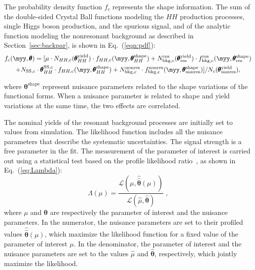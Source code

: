 \documentclass[PAPER, cernpreprint, texlive=2016, paper=a4, USenglish, texmf]{atlasdoc}
\begin{document}
The probability density function $f_c$ represents the shape information. The sum of the double-sided Crystal Ball functions modeling the $HH$ production processes, single Higgs boson production, and the spurious signal, and of the analytic function modeling the nonresonant background as described in  Section~\ref{sec:backpar}, is shown in Eq.~(\ref{eqn:pdf}):
\begin{multline}
\label{eqn:pdf}
f_{c}(\myy, \pmb{\theta}) = [\mu \cdot N_{HH,\mathrm{c}}( \pmb{\theta}_{HH}^\mathrm{yield}) \cdot f_{HH,\mathrm{c}}(\myy,  \pmb{\theta}_{HH}^\mathrm{shape}) + N^{\mathrm{res}}_{\mathrm{bkg, c}}( \pmb{\theta}_{\mathrm{res}}^\mathrm{yield}) \cdot f^{\mathrm{res}}_\mathrm{bkg, c}(\myy,  \pmb{\theta}_{\mathrm{res}}^\mathrm{shape}) \\ + N_\mathrm{SS,c} \cdot  \pmb{\theta}_{HH}^\mathrm{SS, c} \cdot f_{HH,\mathrm{c}}(\myy,  \pmb{\theta}_{HH}^\mathrm{shape}) + N^{\mathrm{nonres}}_{\mathrm{bkg,c}} \cdot f^{\mathrm{nonres}}_{\mathrm{bkg,c}}(\myy,  \pmb{\theta}_{\mathrm{nonres}}^\mathrm{shape})]/N_c( \pmb{\theta}_{\mathrm{nonres}}^\mathrm{yield}),
\end{multline}
 
where $ \pmb{\theta}^\mathrm{shape}$ represent nuisance parameters related to the shape variations of the functional forms. When a nuisance parameter is related to shape and yield variations at the same time, the two effects are correlated.
 
The nominal yields of the resonant background processes are initially set to values from simulation.
The likelihood function includes all the nuisance parameters that describe the systematic uncertainties. The signal strength is a free parameter in the fit.
The measurement of the parameter of interest is carried out using a statistical test based on the profile likelihood ratio~\cite{Cowan:2010js}, as shown in Eq.~(\ref{eq:Lambda}):
\begin{equation}
\Lambda(\mu) =
\frac{\mathcal{L}(\mu, \hat{\hat{\pmb{\theta}}}(\mu)) }{\mathcal{L}(\hat{\mu}, \hat{\pmb{\theta}})} \;,
\label{eq:Lambda}
\end{equation}
where $\mu$ and $\pmb{\theta}$ are respectively the parameter of interest and the nuisance parameters.
In the numerator, the nuisance parameters are set to their profiled values $\hat{\hat{\pmb{\theta}}}(\mu)$, which maximize the likelihood function for a fixed value of the parameter of interest $\mu$. In the denominator, the parameter of interest and the nuisance parameters are set to the values $\hat{\mu}$ and $\hat{\pmb{\theta}}$, respectively, which jointly maximize the likelihood.
 
\end{document}
